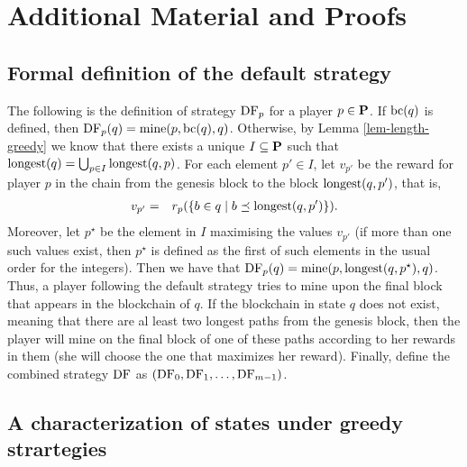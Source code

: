 
\section{Additional Material and Proofs}
\label{sec-appendix}

\subsection{Formal definition of the default strategy}
\label{sec-def-default}

The following is the definition of strategy $\text{\rm DF}_p$ for a player $p \in \mathbf{P}$. If $\text{bc}(q)$ is defined, then $\text{\rm DF}_p(q) = \text{\rm mine}(p,\text{bc}(q),q)$. Otherwise, by Lemma \ref{lem-length-greedy} we know that there exists a unique $I \subseteq \mathbf{P}$ such that ${\text{\rm longest}}(q) = \bigcup_{p \in I} {\text{\rm longest}}(q,p)$. For each element $p' \in I$, let $v_{p'}$ be the reward for player $p$ in the chain from the genesis block to the block ${\text{\rm longest}}(q,p')$, that is,
\begin{eqnarray*}
v_{p'} & = & r_p(\{b \in q \mid b \preceq {\text{\rm longest}}(q,p')\}).
\end{eqnarray*}
Moreover, let $p^\star$ be the element in $I$ maximising the values $v_{p'}$ (if more than one such values exist, then $p^\star$  is defined as the first of such elements in the usual order for the integers). Then we have that $\text{\rm DF}_p(q) = \text{\rm mine}(p,{\text{\rm longest}}(q,p^\star),q)$.
Thus, a player following the default strategy tries to mine upon the final block that appears in the blockchain of $q$. If the blockchain in state $q$ does not exist, meaning that there are al least two longest paths from the genesis block, then the player will mine on the final block of one of these paths according to her rewards in them (she will choose the one that maximizes her reward). Finally, define the combined strategy $\text{\rm DF}$ as $(\text{\rm DF}_0,\text{\rm DF}_1,\dots,\text{\rm DF}_{m-1})$. 


\subsection{A characterization of states under greedy strartegies}
\label{sec-char-states-greedy}

